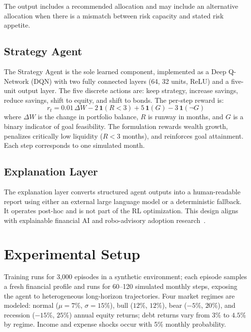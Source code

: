 \documentclass{svproc}
\begin{document}
The output includes a recommended allocation and may include an alternative allocation when there is a mismatch between risk capacity and stated risk appetite.

\subsection{Strategy Agent}

The Strategy Agent is the sole learned component, implemented as a Deep Q-Network (DQN) with two fully connected layers (64, 32 units, ReLU) and a five-unit output layer. The five discrete actions are: keep strategy, increase savings, reduce savings, shift to equity, and shift to bonds. The per-step reward is:
\begin{equation}
r_t = 0.01\,\Delta W - 2\,\mathbf{1}(R < 3) + 5\,\mathbf{1}(G) - 3\,\mathbf{1}(\neg G)
\label{eq:reward}
\end{equation}
where $\Delta W$ is the change in portfolio balance, $R$ is runway in months, and $G$ is a binary indicator of goal feasibility. The formulation rewards wealth growth, penalizes critically low liquidity ($R < 3$ months), and reinforces goal attainment. Each step corresponds to one simulated month.

\subsection{Explanation Layer}
The explanation layer converts structured agent outputs into a human-readable report using either an external large language model or a deterministic fallback. It operates post-hoc and is not part of the RL optimization. This design aligns with explainable financial AI and robo-advisory adoption research~\cite{bendavid2021xai,guan2021explainable,bianchi2021robo,litty2024xai}.

\section{Experimental Setup}

Training runs for 3,000 episodes in a synthetic environment; each episode samples a fresh financial profile and runs for 60--120 simulated monthly steps, exposing the agent to heterogeneous long-horizon trajectories. Four market regimes are modeled: normal ($\mu{=}7\%$, $\sigma{=}15\%$), bull ($12\%$, $12\%$), bear ($-5\%$, $20\%$), and recession ($-15\%$, $25\%$) annual equity returns; debt returns vary from $3\%$ to $4.5\%$ by regime. Income and expense shocks occur with 5\% monthly probability.
\end{document}
